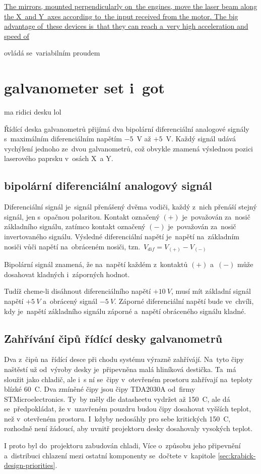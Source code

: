 \href{https://elenlaser.com/blog/galvo-head-laser-focus-tool.html}{The mirrors, mounted perpendicularly on~the engines, move the laser beam along the X~and Y~axes according to~the input received from the motor.
The big advantage of~these devices is~that they can reach a~very high acceleration and speed of}

ovládá se~variabilním proudem

\section{galvanometer set i~got} \label{sec:my-galvos}

ma ridici desku lol

Řídící deska galvanometrů přijímá dva bipolární diferenciální analogové signály s~maximálním diferenciálním napětím $-5$~V až $+5$~V. Každý signál udává vychýlení jednoho ze~dvou galvanometrů, což obvykle znamená výslednou pozici laserového paprsku v~osách X~a Y.

\subsection{bipolární diferenciální analogový signál~\cite{ilda-signal-spec}}
Diferenciální signál je~signál přenášený dvěma vodiči, každý z~nich přenáší stejný signál, jen s~opačnou polaritou. Kontakt označený $(+)$ je~považován za~nosič základního signálu, zatímco kontakt označený $(-)$ je~považován za~nosič invertovaného signálu. Výsledné diferenciální napětí je~napětí na~základním nosiči vůči napětí na~obráceném nosiči, tzn.~$V_{dif} = V_{(+)} - V_{(-)}$

Bipolární signál znamená, že na~napětí každém z~kontaktů $(+)$ a~$(-)$ může dosahovat kladných i~záporných hodnot.

Tudíž cheme-li disáhnout diferenciálního napětí $+10~V$, musí mít základní signál napětí $+5~V$ a~obrácený signál $-5~V$. Záporné diferenciální napětí bude ve~chvíli, kdy je~napětí základního signálu záporné a~napětí obráceného signálu kladné.

\subsection{Zahřívání čipů řídící desky galvanometrů} \label{sec:galvoboard-chips-heating-up}
Dva z~čipů na~řídící desce při chodu systému výrazně zahřívájí. Na~tyto čipy naštěstí už od~výroby desky je~připevněna malá hliníková destička. Ta~má sloužit jako chladič, ale i~s ní se~čipy v~otevřeném prostoru zahřívají na~teploty blízké 60~\degree{}C.
Dva zmíněné čipy jsou čipy TDA2030A od~firmy STMicroelectronics. Ty~by měly dle datasheetu vydržet až 150~\degree{}C, ale dá se~předpokládat, že v~uzavřeném pouzdru budou čipy dosahovat vyšších teplot, než v~otevřeném prostoru. I~kdyby nedosáhly pro sebe kritických 150~\degree{}C, rozhodně není žádoucí, aby uvnitř projektoru desky dosahovaly vysokých teplot.

I proto byl do~projektoru zabudován chladi, Více o~způsobu jeho připevnění a~distribuci chlazení mezi ostatní komponenty se~dočtete v~kapitole \ref{sec:krabick-design-priorities}.
